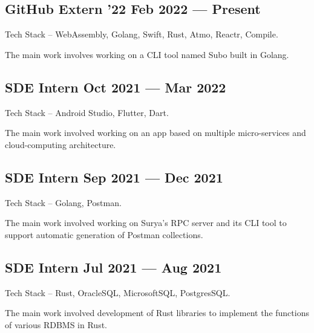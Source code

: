 \documentclass[letter,10pt]{article}
\begin{document}
\subsection{{GitHub Extern '22 \hfill Feb 2022 --- Present}}
\begin{zitemize}
\item Tech Stack -- WebAssembly, Golang, Swift, Rust, Atmo, Reactr, Compile.
\item The main work involves working on a CLI tool named Subo built in Golang.
\end{zitemize}

\subsection{{SDE Intern \hfill Oct 2021 --- Mar 2022}}
\begin{zitemize}
\item Tech Stack -- Android Studio, Flutter, Dart.
\item The main work involved working on an app based on multiple micro-services and cloud-computing architecture.
\end{zitemize}

\subsection{{SDE Intern \hfill Sep 2021 --- Dec 2021}}
\begin{zitemize}
\item Tech Stack -- Golang, Postman.
\item The main work involved working on Surya's RPC server and its CLI tool to support automatic generation of Postman collections.
\end{zitemize}

\subsection{{SDE Intern \hfill Jul 2021 --- Aug 2021}}
\begin{zitemize}
\item Tech Stack -- Rust, OracleSQL, MicrosoftSQL, PostgresSQL.
\item The main work involved development of Rust libraries to implement the functions of various RDBMS in Rust.
\end{zitemize}
\end{document}
